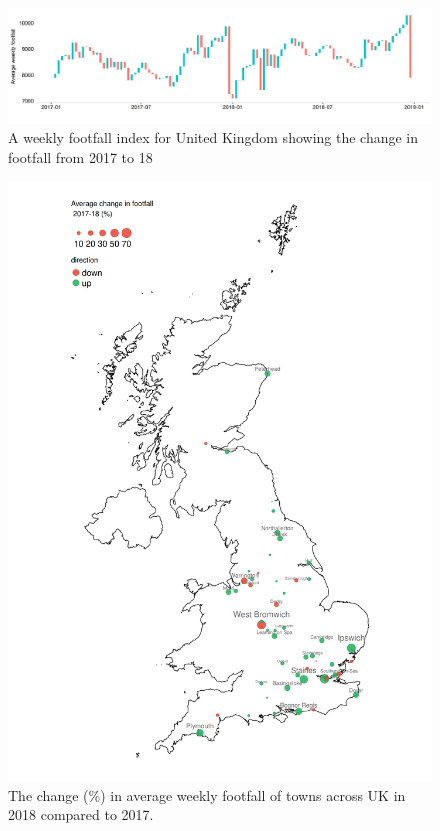 \begin{figure}
  \includegraphics[trim={0 25 0 10},clip]{images/applications-footfall-index.png}
  \caption{A weekly footfall index for United Kingdom showing the change in footfall from 2017 to 18}
  \label{figure:applications:footfall:index}
\end{figure}


\cleartoleftpage
\begin{figure}
  \forceversofloat
  \includegraphics[trim={0 0 0 0},clip]{images/applications-cities-rank.png}
  \caption{The change (\%) in average weekly footfall of towns across UK in 2018 compared to 2017.}
  \label{figure:applications:cities:change}
\end{figure}

